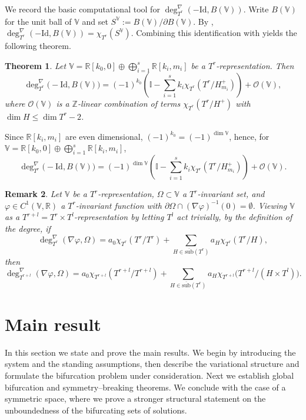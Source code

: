 \documentclass[reqno,twoside,12pt]{amsart}
\newtheorem{Remark}{Remark}[section]
\newtheorem{Theorem}[Remark]{Theorem}
\newcommand{\bI}{\mathbb{I}}
\newcommand{\bR}{\mathbb{R}}
\newcommand{\bV}{\mathbb{V}}
\newcommand{\cO}{\mathcal{O}}
\numberwithin{equation}{section} \errorcontextlines=0
\newcommand{\sub}{\overline{\mathrm{sub}}}
\begin{document}
We record the basic computational tool for $\deg^{\nabla}_{T^r}(-\mathrm{Id},B(\bV))$.
Write $B(\bV)$ for the unit ball of $\bV$ and set $S^{\bV}:=B(\bV)/\partial B(\bV)$.
By \cite{Geba},
$\deg^{\nabla}_{T^r} (-\mathrm{Id},B(\bV) )=\chi_{T^r}(S^{\bV}).$
Combining this identification with \cite[Thm.~3.2]{GarRyb} yields the following theorem.



\begin{Theorem}\label{thm:UTnmult}
Let $\bV=\bR[k_0,0]\oplus\bigoplus_{i=1}^{s}\bR[k_i,m_i]$ be a $T^r$-representation. Then
\[
\deg^{\nabla}_{T^r}\bigl(-\mathrm{Id},B(\bV)\bigr)=(-1)^{k_0} \left(\bI-\sum_{i=1}^{s}k_i \chi_{T^r}(T^r/H_{m_i}^{+})\right)+\cO(\bV),
\]
where $\cO(\bV)$ is a $\mathbb{Z}$-linear combination of terms $\chi_{T^r}(T^r/H^{+})$ with $\dim H\le \dim T^r-2$.
\end{Theorem}

Since $\bR[k_i,m_i]$ are even dimensional, $(-1)^{k_0}=(-1)^{\dim \bV}$, hence, for $\bV=\bR[k_0,0]\oplus\bigoplus_{i=1}^{s}\bR[k_i,m_i]$,
\begin{equation}\label{eq:deg-id}
\deg^{\nabla}_{T^r}\bigl(-\mathrm{Id},B(\bV)\bigr)=(-1)^{\dim\bV} \left(\bI-\sum_{i=1}^{s}k_i \chi_{T^r}(T^r/H_{m_i}^{+})\right)+\cO(\bV).
\end{equation}

\begin{Remark}\label{rem:lift-degree-to-big-torus}
Let $\bV$ be a $T^{r}$-representation, $\Omega\subset \bV$ a $T^{r}$-invariant set, and $\varphi\in C^{1}(\bV,\mathbb{R})$ a $T^{r}$-invariant function with $\partial\Omega\cap(\nabla\varphi)^{-1}(0)=\emptyset$. Viewing $\bV$ as a $T^{r+l}=T^{r}\times T^{l}$-representation by letting $T^{l}$ act trivially, by the definition of the degree, if
\[
\deg^{\nabla}_{T^{r}}(\nabla\varphi,\Omega)
= a_{0} \chi_{T^{r}}(T^{r}/T^{r})+\sum_{H\in\sub(T^{r})} a_{H} \chi_{T^{r}}(T^{r}/H),
\]
 then
\[
\deg^{\nabla}_{T^{r+l}}(\nabla\varphi,\Omega)
= a_{0} \chi_{T^{r+l}}(T^{r+l}/T^{r+l})+\sum_{H\in\sub(T^{r})} a_{H} \chi_{T^{r+l}}\bigl(T^{r+l}/(H\times T^{l})\bigr).
\]
\end{Remark}


\section{Main result}\label{sec:main}

In this section we state and prove the main results. We begin by introducing the system and the standing assumptions, then describe the variational structure and formulate the bifurcation problem under consideration. Next we establish global bifurcation and symmetry--breaking theorems. We conclude with the case of a symmetric space, where we prove a stronger structural statement on the unboundedness of the bifurcating sets of solutions.
\end{document}
